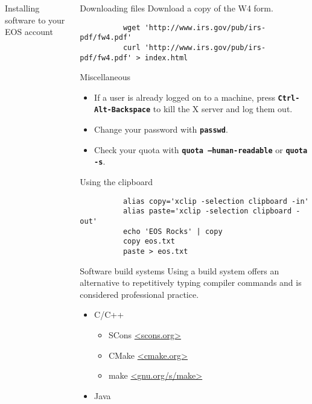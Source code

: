 \documentclass[8pt]{beamer}
\newcommand{\command}[1]{\textbf{\texttt{#1}}}
\begin{document}
\begin{frame}[fragile]{}
\begin{columns}
\begin{column}{0.33\textwidth}
\begin{block}{Installing software to your EOS account}
        {\scriptsize \inputminted[tabsize=2]{bash}{scripts/install-aria2.bash}}
      \end{block}
    \end{column}
    \begin{column}{0.33\textwidth}
      \begin{block}{Downloading files}
        Download a copy of the W4 form.
        \begin{verbatim}
          wget 'http://www.irs.gov/pub/irs-pdf/fw4.pdf'
          curl 'http://www.irs.gov/pub/irs-pdf/fw4.pdf' > index.html
        \end{verbatim}
      \end{block}
      \begin{block}{Miscellaneous}
        \begin{itemize}
        \item If a user is already logged on to a machine, press \command{Ctrl-Alt-Backspace} to kill the X server and log them out.
        \item Change your password with \command{passwd}.
        \item Check your quota with \command{quota --human-readable} or \command{quota -s}.
        \end{itemize}
      \end{block}
      \begin{block}{Using the clipboard}
        \begin{verbatim}
          alias copy='xclip -selection clipboard -in'
          alias paste='xclip -selection clipboard -out'
          echo 'EOS Rocks' | copy
          copy eos.txt
          paste > eos.txt
        \end{verbatim}
      \end{block}
      \begin{block}{Software build systems}
        Using a build system offers an alternative to repetitively typing compiler commands and is considered professional practice.
        \begin{itemize}
        \item C/C++
          \begin{itemize}
          \item SCons \url{<scons.org>}
          \item CMake \url{<cmake.org>}
          \item make \url{<gnu.org/s/make>}
          \end{itemize}
        \item Java

\end{itemize}
\end{block}
\end{column}
\end{columns}
\end{frame}
\end{document}
